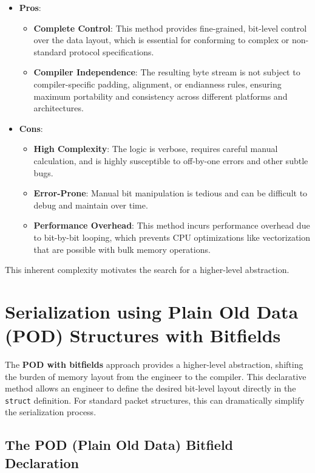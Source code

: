 \documentclass{article}
\begin{document}
\begin{itemize}
    \item \textbf{Pros}:
    \begin{itemize}
        \item \textbf{Complete Control}: This method provides fine-grained, bit-level control over the data layout, which is essential for conforming to complex or non-standard protocol specifications.
        \item \textbf{Compiler Independence}: The resulting byte stream is not subject to compiler-specific padding, alignment, or endianness rules, ensuring maximum portability and consistency across different platforms and architectures.
    \end{itemize}
    \item \textbf{Cons}:
    \begin{itemize}
        \item \textbf{High Complexity}: The logic is verbose, requires careful manual calculation, and is highly susceptible to off-by-one errors and other subtle bugs.
        \item \textbf{Error-Prone}: Manual bit manipulation is tedious and can be difficult to debug and maintain over time.
        \item \textbf{Performance Overhead}: This method incurs performance overhead due to bit-by-bit looping, which prevents CPU optimizations like vectorization that are possible with bulk memory operations.
    \end{itemize}
\end{itemize}

This inherent complexity motivates the search for a higher-level abstraction.

\section{Serialization using Plain Old Data (POD) Structures with Bitfields}

The \textbf{POD with bitfields} approach provides a higher-level abstraction, shifting the burden of memory layout from the engineer to the compiler. This declarative method allows an engineer to define the desired bit-level layout directly in the \texttt{struct} definition. For standard packet structures, this can dramatically simplify the serialization process.

\subsection{The POD (Plain Old Data) Bitfield Declaration}
\end{document}
